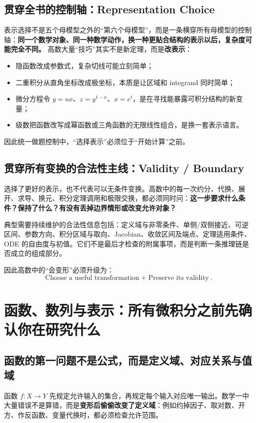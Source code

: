 \documentclass[11pt,a4paper,openany]{ctexbook}
\newcommand{\key}[1]{\textbf{\color{deep}#1}}
\begin{document}
\section{贯穿全书的控制轴：Representation Choice}
表示选择不是五个母模型之外的“第六个母模型”，而是一条横穿所有母模型的控制轴：\key{同一个数学对象、同一种数学动作，换一种更贴合结构的表示以后，复杂度可能完全不同。} 高数大量“技巧”其实不是新定理，而是\key{改表示}：
\begin{itemize}
  \item 隐函数改成参数式，复杂切线可能立刻简单；
  \item 二重积分从直角坐标改成极坐标，本质是让区域和 integrand 同时简单；
  \item 微分方程令 $y=ux$、$z=y^{1-n}$、$x=e^t$，是在寻找能暴露可积分结构的新变量；
  \item 级数把函数改写成幂函数或三角函数的无限线性组合，是换一套表示语言。
\end{itemize}
因此统一做题控制中，“选择表示”必须位于“开始计算”之前。

\section{贯穿所有变换的合法性主线：Validity / Boundary}
选择了更好的表示，也不代表可以无条件变换。高数中的每一次约分、代换、展开、求导、换元、积分定理调用和极限交换，都必须同时问：\key{这一步要求什么条件？保持了什么？有没有丢掉边界情形或改变允许对象？}

典型需要持续维护的合法性信息包括：定义域与非零条件、单侧/双侧接近、可逆区间、参数方向、积分区域与取向、Jacobian、收敛区间及端点、定理适用条件、ODE 的自由度与初值。它们不是最后才检查的附属事项，而是判断一条推理链是否成立的组成部分。

因此高数中的“会变形”必须升级为：
\[
\boxed{\text{Choose a useful transformation}\; +\; \text{Preserve its validity}}.
\]

\chapter{函数、数列与表示：所有微积分之前先确认你在研究什么}

\section{函数的第一问题不是公式，而是定义域、对应关系与值域}
函数 $f:X\to Y$ 先规定允许输入的集合，再规定每个输入对应唯一输出。数学一中大量错误不是算错，而是\key{变形后偷偷改变了定义域}：例如约掉因子、取对数、开方、作反函数、变量代换时，都必须检查允许范围。
\end{document}
